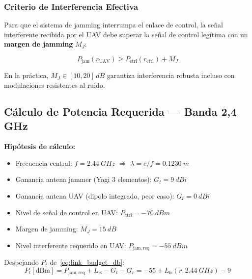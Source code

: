 \documentclass[12pt,a4paper]{article}
\begin{document}
\subsubsection{Criterio de Interferencia Efectiva}

Para que el sistema de jamming interrumpa el enlace de control,
la señal interferente recibida por el UAV debe superar la señal
de control legítima con un \textbf{margen de jamming} $M_J$:

\begin{equation}
  P_\mathrm{jam}(r_\mathrm{UAV}) \geq P_\mathrm{ctrl}(r_\mathrm{ctrl}) + M_J
  \label{eq:margen}
\end{equation}

En la práctica, $M_J \in [10, 20]\,\si{dB}$ garantiza interferencia
robusta incluso con modulaciones resistentes al ruido.

\newpage

\subsection{Cálculo de Potencia Requerida — Banda 2,4\,GHz}

\textbf{Hipótesis de cálculo:}
\begin{itemize}[noitemsep]
  \item Frecuencia central: $f = \SI{2.44}{GHz}$
        $\Rightarrow$ $\lambda = c/f = \SI{0.1230}{m}$
  \item Ganancia antena jammer (Yagi 3 elementos): $G_t = \SI{9}{dBi}$
  \item Ganancia antena UAV (dipolo integrado, peor caso): $G_r = \SI{0}{dBi}$
  \item Nivel de señal de control en UAV: $P_\mathrm{ctrl} = \SI{-70}{dBm}$
  \item Margen de jamming: $M_J = \SI{15}{dB}$
  \item Nivel interferente requerido en UAV: $P_\mathrm{jam,req} = \SI{-55}{dBm}$
\end{itemize}

Despejando $P_t$ de~\eqref{eq:link_budget_db}:
\[
  P_t[\mathrm{dBm}] = P_\mathrm{jam,req} + L_\mathrm{fs} - G_t - G_r
                    = -55 + L_\mathrm{fs}(r, \SI{2.44}{GHz}) - 9
\]
\end{document}
